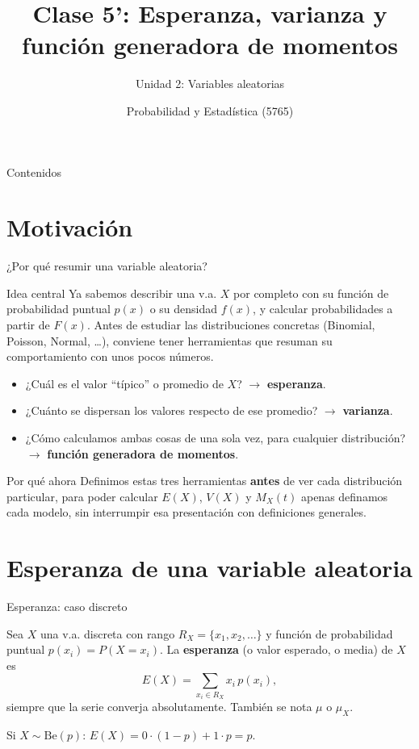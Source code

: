 \documentclass[aspectratio=169,11pt]{beamer}
\title[Prob. y Estadística]{Clase 5': Esperanza, varianza y función generadora de momentos}
\subtitle{Unidad 2: Variables aleatorias}
\institute[UNS]{Universidad Nacional del Sur \\ Departamento de Matemática}
\author{Probabilidad y Estadística (5765)}
\date{}
\begin{document}
\begin{frame}
\titlepage
\end{frame}

\begin{frame}{Contenidos}
\tableofcontents
\end{frame}

\section{Motivación}

\begin{frame}{¿Por qué resumir una variable aleatoria?}
\begin{block}{Idea central}
Ya sabemos describir una v.a. $X$ por completo con su función de probabilidad puntual $p(x)$ o su densidad $f(x)$, y calcular probabilidades a partir de $F(x)$. Antes de estudiar las distribuciones concretas (Binomial, Poisson, Normal, \dots), conviene tener herramientas que resuman su comportamiento con unos pocos números.
\end{block}

\begin{itemize}
\item ¿Cuál es el valor ``típico'' o promedio de $X$? $\to$ \textbf{esperanza}.
\item ¿Cuánto se dispersan los valores respecto de ese promedio? $\to$ \textbf{varianza}.
\item ¿Cómo calculamos ambas cosas de una sola vez, para cualquier distribución? $\to$ \textbf{función generadora de momentos}.
\end{itemize}

\begin{alertblock}{Por qué ahora}
Definimos estas tres herramientas \textbf{antes} de ver cada distribución particular, para poder calcular $E(X)$, $V(X)$ y $M_X(t)$ apenas definamos cada modelo, sin interrumpir esa presentación con definiciones generales.
\end{alertblock}
\end{frame}

\section{Esperanza de una variable aleatoria}

\begin{frame}{Esperanza: caso discreto}
\begin{definition}
Sea $X$ una v.a. discreta con rango $R_X=\{x_1,x_2,\dots\}$ y función de probabilidad puntual $p(x_i)=P(X=x_i)$. La \textbf{esperanza} (o valor esperado, o media) de $X$ es
\[
E(X) = \sum_{x_i\in R_X} x_i\, p(x_i),
\]
siempre que la serie converja absolutamente. También se nota $\mu$ o $\mu_X$.
\end{definition}

\begin{example}
Si $X\sim\text{Be}(p)$: $E(X) = 0\cdot(1-p) + 1\cdot p = p$.
\end{example}
\end{frame}
\end{document}

